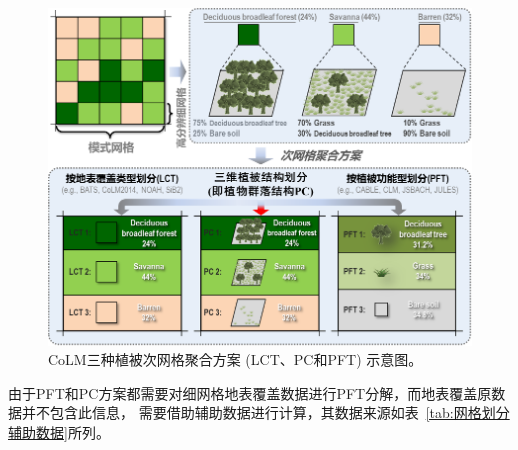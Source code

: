 {
\begin{figure}[]
\centering
\includegraphics{Figures/基础数据/次网格聚合方案.png}
\caption{CoLM三种植被次网格聚合方案 (LCT、PC和PFT) 示意图。}
\label{fig:次网格聚合方案}
\end{figure}
}


由于PFT和PC方案都需要对细网格地表覆盖数据进行PFT分解，而地表覆盖原数据并不包含此信息，
需要借助辅助数据进行计算，其数据来源如表~\ref{tab:网格划分辅助数据}所列。


